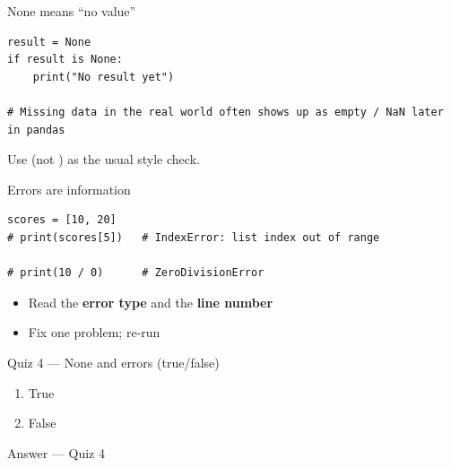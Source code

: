 \documentclass[aspectratio=169,11pt]{beamer}
\begin{document}
    \begin{frame}[fragile]{None means ``no value''}
        \begin{lstlisting}
result = None
if result is None:
    print("No result yet")

# Missing data in the real world often shows up as empty / NaN later in pandas
        \end{lstlisting}
        \vspace{0.3em}
        Use  (not ) as the usual style check.
    \end{frame}

    \begin{frame}[fragile]{Errors are information}
        \begin{lstlisting}
scores = [10, 20]
# print(scores[5])   # IndexError: list index out of range

# print(10 / 0)      # ZeroDivisionError
        \end{lstlisting}
        \vspace{0.3em}
        \begin{itemize}
            \item Read the \textbf{error type} and the \textbf{line number}
            \item Fix one problem; re-run
        \end{itemize}
        \vspace{0.3em}
    \end{frame}

    \begin{frame}{Quiz 4 --- None and errors (true/false)}
        \begin{enumerate}
            \item True
            \item False
        \end{enumerate}
        \quizpause
    \end{frame}

    \begin{frame}{Answer --- Quiz 4}
    \end{frame}

\end{document}
